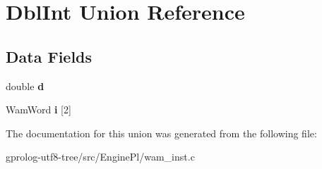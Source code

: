 \hypertarget{unionDblInt}{}\section{Dbl\+Int Union Reference}
\label{unionDblInt}
\subsection*{Data Fields}
\begin{DoxyCompactItemize}
\item 
double {\bfseries d}\hypertarget{unionDblInt_a23665c821d8bb2ce3af4f5783fa5ed7c}{}\label{unionDblInt_a23665c821d8bb2ce3af4f5783fa5ed7c}

\item 
Wam\+Word {\bfseries i} \mbox{[}2\mbox{]}\hypertarget{unionDblInt_ad0ddb3bdd3543a38a19752bc2ac77885}{}\label{unionDblInt_ad0ddb3bdd3543a38a19752bc2ac77885}

\end{DoxyCompactItemize}


The documentation for this union was generated from the following file\+:\begin{DoxyCompactItemize}
\item 
gprolog-\/utf8-\/tree/src/\+Engine\+Pl/wam\+\_\+inst.\+c\end{DoxyCompactItemize}
